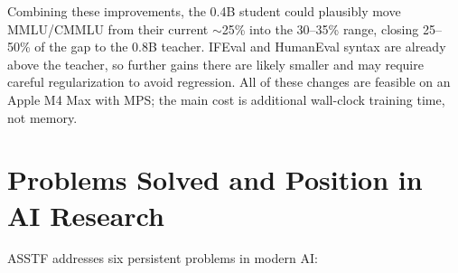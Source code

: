 \documentclass[11pt,a4paper]{article}
\theoremstyle{definition}
\begin{document}
\begin{table}[t]
\centering
\small
\setlength{\tabcolsep}{3pt}
\caption{Estimated headroom from implementing missing ASSTF capabilities in the Qwen 0.8B$\rightarrow$0.4B pipeline. Estimates are conservative and assume the same 0.4B parameter budget.}
\label{tab:headroom}
\end{table}

Combining these improvements, the 0.4B student could plausibly move MMLU/CMMLU from their current $\sim$25\% into the 30--35\% range, closing 25--50\% of the gap to the 0.8B teacher. IFEval and HumanEval syntax are already above the teacher, so further gains there are likely smaller and may require careful regularization to avoid regression. All of these changes are feasible on an Apple M4 Max with MPS; the main cost is additional wall-clock training time, not memory.

\section{Problems Solved and Position in AI Research}
\label{sec:innovation}

ASSTF addresses six persistent problems in modern AI:
\end{document}
